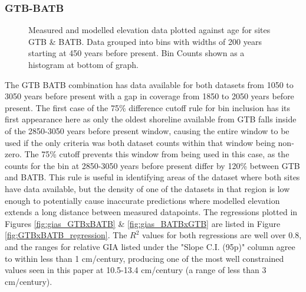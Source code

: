 \subsubsection{GTB-BATB}

\begin{figure}[H]
	\caption{Measured and modelled elevation data plotted against age for sites GTB \& BATB. Data grouped into bins with widths of 200 years starting at 450 years before present. Bin Counts shown as a histogram at bottom of graph.}	
	\label{fig:data_GTBxBATB}
\end{figure}
The GTB BATB combination has data available for both datasets from 1050 to 3050 years before present with 
a gap in coverage from 1850 to 2050 years before present. The first case of the
75\% difference cutoff rule for bin inclusion has its first appearance here as
only the oldest shoreline available from GTB falls inside of the 2850-3050 years
before present window, causing the entire window to be
used if the only criteria was both dataset counts within that window being non-zero.
The 75\% cutoff prevents this window from being used in this case, as the counts
for the bin at 2850-3050 years before present differ by 120\% between GTB and BATB. This rule is useful in identifying
areas of the dataset where both sites have data available, but the density of
one of the datasets in that region is low enough to potentially cause inaccurate
predictions where modelled elevation extends a long distance between measured datapoints.
The regressions plotted in
Figures \ref{fig:gias_GTBxBATB} \& \ref{fig:gias_BATBxGTB} are listed in 
Figure \ref{fig:GTBxBATB_regression}. The $R^2$ values for both regressions
are well over 0.8, and the ranges for relative GIA listed under the "Slope C.I. (95p)" column
agree to within less than 1 cm/century,
producing one of the most well constrained values seen in this paper at 10.5-13.4 cm/century (a range of less than 3 cm/century). \\


